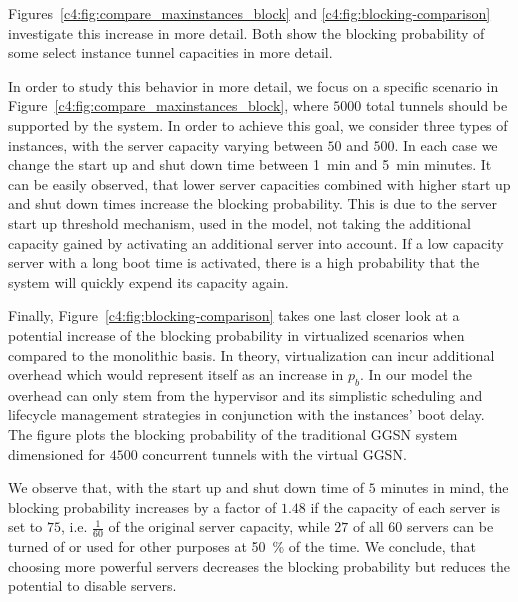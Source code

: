 Figures~\ref{c4:fig:compare_maxinstances_block} and \ref{c4:fig:blocking-comparison} investigate this increase in more detail. Both show the blocking probability of some select instance tunnel capacities in more detail.




In order to study this behavior in more detail, we focus on a specific scenario in Figure~\ref{c4:fig:compare_maxinstances_block}, where $5000$ total tunnels should be supported by the system. In order to achieve this goal, we consider three types of instances, with the server capacity varying between $50$ and $500$.  In each case we change the start up and shut down time between \SI{1}{\minute} and \SI{5}{\minute} minutes. It can be easily observed, that lower server capacities combined with higher start up and shut down times increase the blocking probability. This is due to the server start up threshold mechanism, used in the model, not taking the additional capacity gained by activating an additional server into account. If a low capacity server with a long boot time is activated, there is a high probability that the system will quickly expend its capacity again.




Finally, Figure~\ref{c4:fig:blocking-comparison} takes one last closer look at a potential increase of the blocking probability in virtualized scenarios when compared to the monolithic basis. In theory, virtualization can incur additional overhead which would represent itself as an increase in $p_b$. In our model the overhead can only stem from the hypervisor and its simplistic scheduling  and lifecycle management strategies in conjunction with the instances' boot delay. The figure plots the blocking probability of the traditional \gls{GGSN} system dimensioned for $4500$ concurrent tunnels with the virtual \gls{GGSN}.

We observe that, with the start up and shut down time of $5$ minutes in mind, the blocking probability increases by a factor of $1.48$ if the capacity of each server is set to $75$, i.e. $\frac{1}{60}$ of the original server capacity, while $27$ of all $60$ servers can be turned of or used for other purposes at \SI{50}{\percent} of the time. We conclude, that choosing more powerful servers decreases the blocking probability but reduces the potential to disable servers.



